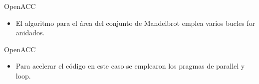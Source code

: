 \documentclass[aspectratio=169]{beamer}
\begin{document}
\begin{frame}{OpenACC}
    \begin{itemize}
        \item El algoritmo para el área del conjunto de Mandelbrot emplea varios bucles for anidados.
    \end{itemize}

    \begin{figure}
        \centering
    \end{figure}
\end{frame}

\begin{frame}{OpenACC}
    \begin{itemize}
        \item Para acelerar el código en este caso se emplearon los pragmas de parallel y loop.
    \end{itemize}

    \begin{figure}
        \centering
    \end{figure}
\end{frame}
\end{document}
